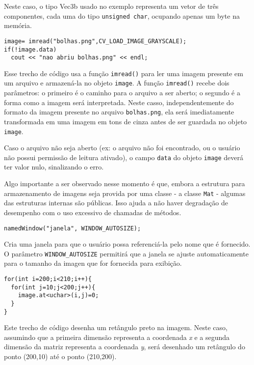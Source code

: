 \documentclass[11pt]{amsbook}
\begin{document}
Neste caso, o tipo Vec3b usado no exemplo representa um vetor de três
componentes, cada uma do tipo \texttt{unsigned char}, ocupando apenas um
byte na memória.


\begin{verbatim}
image= imread("bolhas.png",CV_LOAD_IMAGE_GRAYSCALE);
if(!image.data)
  cout << "nao abriu bolhas.png" << endl;
\end{verbatim}

Esse trecho de código usa a função \texttt{imread()} para ler uma imagem
presente em um arquivo e armazená-la no objeto \texttt{image}. A função
\texttt{imread()} recebe dois parâmetros: o primeiro é o caminho para o arquivo
a ser aberto; o segundo é a forma como a imagem será
interpretada. Neste casso, independentemente do formato da imagem
presente no arquivo \texttt{bolhas.png}, ela será imediatamente transformada
em uma imagem em tons de cinza antes de ser guardada no objeto
\texttt{image}.


Caso o arquivo não seja aberto (ex: o arquivo não foi encontrado, ou o
usuário não possui permissão de leitura ativado), o campo \texttt{data} do
objeto \texttt{image} deverá ter valor nulo, sinalizando o erro.


Algo importante a ser observado nesse momento é que, embora a
estrutura para armazenamento de imagens seja provida por uma classe -
a classe \texttt{Mat} - algumas das estruturas internas são públicas. Isso
ajuda a não haver degradação de desempenho com o uso excessivo de
chamadas de métodos.


\begin{verbatim}
namedWindow("janela", WINDOW_AUTOSIZE);
\end{verbatim}

Cria uma janela para que o usuário possa referenciá-la pelo nome que é
fornecido. O parâmetro \texttt{WINDOW_AUTOSIZE} permitirá que a janela se
ajuste automaticamente para o tamanho da imagen que for fornecida para
exibição.


\begin{verbatim}
for(int i=200;i<210;i++){
  for(int j=10;j<200;j++){
    image.at<uchar>(i,j)=0;
  }
}
\end{verbatim}

Este trecho de código desenha um retângulo preto na imagem. Neste
caso, assumindo que a primeira dimensão representa a coordenada \emph{x} e
a segunda dimensão da matriz representa a coordenada \emph{y}, será
desenhado um retângulo do ponto (200,10) até o ponto
(210,200).
\end{document}
